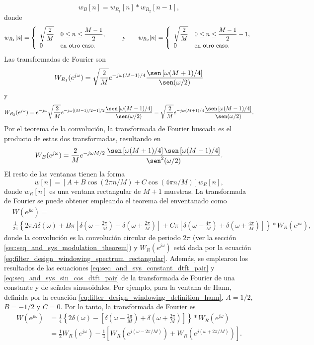 \documentclass[a4paper]{report}
\begin{document}
\[
 w_B[n]=w_{R_1}[n]*w_{R_2}[n-1],
\]
donde
\[
 w_{R_1}[n]=\left\{ 
   \begin{array}{ll}
     \sqrt{\dfrac{2}{M}} & 0\leq n\leq \dfrac{M-1}{2},\\[\medskipamount] 
     0 & \textrm{en otro caso.}
   \end{array}
   \right.
 \qquad\textrm{y}\qquad
  w_{R_2}[n]=\left\{ 
   \begin{array}{ll}
     \sqrt{\dfrac{2}{M}} & 0\leq n\leq \dfrac{M-1}{2}-1,\\[\medskipamount] 
     0 & \textrm{en otro caso.}
   \end{array}
   \right.
\]
Las transformadas de Fourier son
\[
 W_{R_1}(e^{j\omega})=\sqrt{\dfrac{2}{M}}e^{-j\omega (M-1)/4}\frac{\sen\left[\omega(M+1)/4\right]}{\sen(\omega/2)}
\]
y
\[
  W_{R_2}(e^{j\omega})=e^{-j\omega}\sqrt{\dfrac{2}{M}}e^{-j\omega[(M-1)/2-1]/2}\frac{\sen\left[\omega(M-1)/4\right]}{\sen(\omega/2)}
  =\sqrt{\dfrac{2}{M}}e^{-j\omega(M+1)/4}\frac{\sen\left[\omega(M-1)/4\right]}{\sen(\omega/2)}.
\]
Por el teorema de la convolución, la transformada de Fourier buscada es el producto de estas dos transformadas, resultando en
\begin{equation}\label{eq:filter_design_windowing_spectrum_bartlett_odd}
 W_B(e^{j\omega})=\dfrac{2}{M}e^{-j\omega M/2}\,\frac{\sen\left[\omega(M+1)/4\right]\sen\left[\omega(M-1)/4\right]}{\sen^2(\omega/2)}.
\end{equation}
El resto de las ventanas tienen la forma 
\[
 w[n]=[A+B\cos(2\pi n/M)+C\cos(4\pi n/M)]w_R[n],
\]
donde \(w_R[n]\) es una ventana rectangular de \(M+1\) muestras. La transformada de Fourier se puede obtener empleando el teorema del enventanado como
\begin{align*}
  &W(e^{j\omega})=\\
  &\frac{1}{2\pi}\left\{2\pi A\delta(\omega)+B\pi\left[\delta\left(\omega-\frac{2\pi}{M}\right)+\delta\left(\omega+\frac{2\pi}{M}\right)\right]+C\pi\left[\delta\left(\omega-\frac{4\pi}{M}\right)+\delta\left(\omega+\frac{4\pi}{M}\right)\right]\right\}*W_R(e^{j\omega}),
\end{align*}
donde la convolución es la convolución circular de periodo \(2\pi\) (ver la sección \ref{sec:seq_and_sys_modulation_theorem}) y \(W_R(e^{j\omega})\) está dada por la ecuación \ref{eq:filter_design_windowing_spectrum_rectangular}. Además, se emplearon los resultados de las ecuaciones \ref{eq:seq_and_sys_constant_dtft_pair} y \ref{eq:seq_and_sys_sin_cos_dtft_pair} de la transformada de Fourier de una constante y de señales sinusoidales. Por ejemplo, para la ventana de Hann, definida por la ecuación \ref{eq:filter_design_windowing_definition_hann}, \(A=1/2\), \(B=-1/2\) y \(C=0\). Por lo tanto, la transformada de Fourier es 
\begin{align*}
 W(e^{j\omega})&=\frac{1}{4}\left\{2\delta(\omega)-\left[\delta\left(\omega-\frac{2\pi}{M}\right)+\delta\left(\omega+\frac{2\pi}{M}\right)\right]\right\}*W_R(e^{j\omega})\\
 &=\frac{1}{2}W_R(e^{j\omega})-\frac{1}{4}\left[W_R\left(e^{j(\omega-2\pi/M)}\right)+W_R\left(e^{j(\omega+2\pi/M)}\right)\right].
\end{align*}
\end{document}

